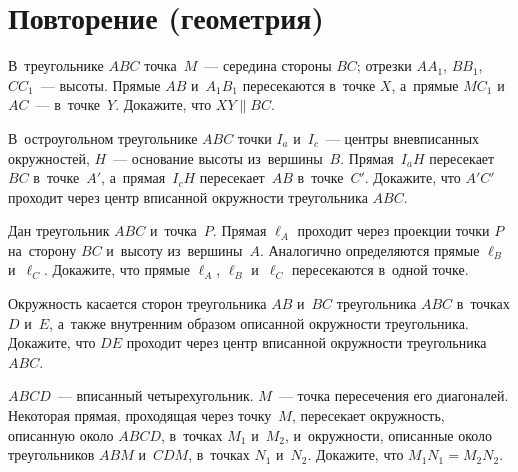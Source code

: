 
\section*{Повторение (геометрия)}


\begin{problems}

\item
В~треугольнике $ABC$ точка~$M$~— середина стороны $BC$;
отрезки $A A_1$, $B B_1$, $C C_1$~— высоты.
Прямые $AB$ и~$A_1 B_1$ пересекаются в~точке $X$, а~прямые $M C_1$ и~$AC$~—
в~точке~$Y$.
Докажите, что $XY \parallel BC$.

\item
В~остроугольном треугольнике $ABC$ точки $I_a$ и~$I_c$~— центры вневписанных
окружностей, $H$~— основание высоты из~вершины~$B$.
Прямая~$I_a H$ пересекает~$BC$ в~точке~$A'$, а~прямая~$I_c H$ пересекает~$AB$
в~точке~$C'$.
Докажите, что $A'C'$ проходит через центр вписанной окружности
треугольника $ABC$.

\item
Дан треугольник $ABC$ и~точка~$P$.
Прямая $\ell_A$ проходит через проекции точки $P$ на~сторону $BC$ и~высоту
из~вершины~$A$.
Аналогично определяются прямые $\ell_B$ и~$\ell_C$.
Докажите, что прямые $\ell_A$, $\ell_B$ и~$\ell_C$ пересекаются в~одной точке.

\item
Окружность касается сторон треугольника $AB$ и~$BC$ треугольника $ABC$
в~точках $D$ и~$E$, а~также внутренним образом описанной окружности
треугольника.
Докажите, что $DE$ проходит через центр вписанной окружности
треугольника $ABC$.

\item
$ABCD$~— вписанный четырехугольник.
$M$~— точка пересечения его диагоналей.
Некоторая прямая, проходящая через точку~$M$, пересекает окружность, описанную
около $ABCD$, в~точках $M_1$ и~$M_2$, и~окружности, описанные около
треугольников $ABM$ и~$CDM$, в~точках $N_1$ и~$N_2$.
Докажите, что $M_1 N_1 = M_2 N_2$.

\end{problems}

